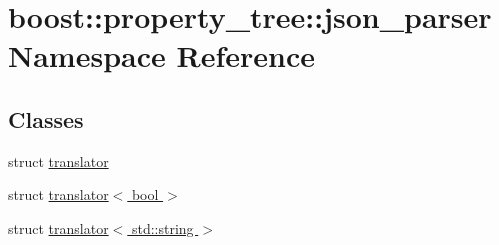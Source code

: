 \hypertarget{namespaceboost_1_1property__tree_1_1json__parser}{}\section{boost\+:\+:property\+\_\+tree\+:\+:json\+\_\+parser Namespace Reference}
\label{namespaceboost_1_1property__tree_1_1json__parser}
\subsection*{Classes}
\begin{DoxyCompactItemize}
\item 
struct \hyperlink{structboost_1_1property__tree_1_1json__parser_1_1translator}{translator}
\item 
struct \hyperlink{structboost_1_1property__tree_1_1json__parser_1_1translator_3_01bool_01_4}{translator$<$ bool $>$}
\item 
struct \hyperlink{structboost_1_1property__tree_1_1json__parser_1_1translator_3_01std_1_1string_01_4}{translator$<$ std\+::string $>$}
\end{DoxyCompactItemize}
